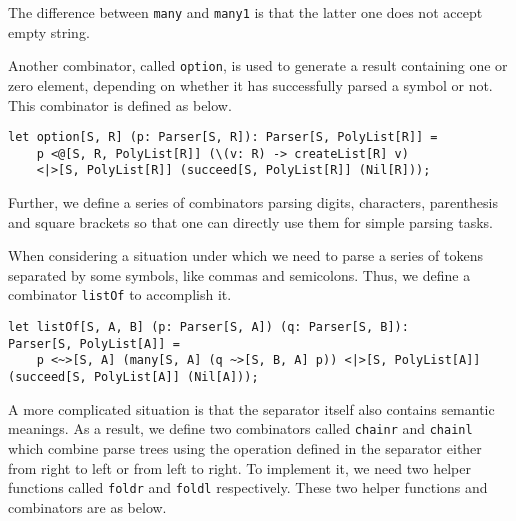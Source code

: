 The difference between \texttt{many} and \texttt{many1} is that the latter one does not accept empty string.

Another combinator, called \texttt{option}, is used to generate a result containing one or zero element, depending on whether it has successfully parsed a symbol or not. This combinator is defined as below.

\begin{lstlisting}
let option[S, R] (p: Parser[S, R]): Parser[S, PolyList[R]] =
    p <@[S, R, PolyList[R]] (\(v: R) -> createList[R] v)
    <|>[S, PolyList[R]] (succeed[S, PolyList[R]] (Nil[R]));
\end{lstlisting}

Further, we define a series of combinators parsing digits, characters, parenthesis and square brackets so that one can directly use them for simple parsing tasks.

When considering a situation under which we need to parse a series of tokens separated by some symbols, like commas and semicolons. Thus, we define a combinator \texttt{listOf} to accomplish it.

\begin{lstlisting}
let listOf[S, A, B] (p: Parser[S, A]) (q: Parser[S, B]):
Parser[S, PolyList[A]] =
    p <~>[S, A] (many[S, A] (q ~>[S, B, A] p)) <|>[S, PolyList[A]] (succeed[S, PolyList[A]] (Nil[A]));
\end{lstlisting}

A more complicated situation is that the separator itself also contains semantic meanings. As a result, we define two combinators called \texttt{chainr} and \texttt{chainl} which combine parse trees using the operation defined in the separator either from right to left or from left to right. To implement it, we need two helper functions called \texttt{foldr} and \texttt{foldl} respectively. These two helper functions and combinators are as below.

